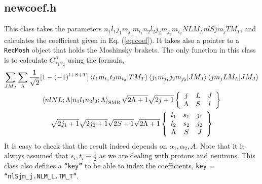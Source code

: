 \documentclass[10pt]{article}
\begin{document}
\subsection{newcoef.h}
This class takes the parameters $n_1 l_1 j_1 m_{j_1} m_{t_1} n_2 l_2 j_2 m_{j_2} m_{t_2} N L M_L n l S j m_j T M_T$, and calculates the coefficient given in Eq. (\ref{eq:coef}). It takes also a pointer to a \texttt{RecMosh} object that holds the Moshinsky brakets. The only function in this class is to calculate $C_{\alpha_1 \alpha_2}^{A}$ using the formula,
\begin{multline}
	\sum_{J M_J} \sum_{\Lambda} 
	\frac{1}{\sqrt{2}} [ 1 - (-1)^{l+S+T}] \braket{ t_1 m_{t_1} t_2 m_{t_2} | T M_T }
	\braket{ j_1 m_{j_1} j_2 m_{j_2} | J M_J}
	\braket{ j m_j L M_L | J M_J } \\
	\braket{ n l N L; \Lambda | n_1 l_1 n_2 l_2 ; \Lambda}_{\textrm{SMB}}
	\sqrt{2 \Lambda + 1} \sqrt{ 2j+1}
	\left\{
	\begin{array}{ccc}
		j & L & J \\
		\Lambda & S & l
	\end{array}
	\right\} \\
	\sqrt{2j_1 + 1} \sqrt{2j_2 + 1} \sqrt{ 2S + 1} \sqrt{ 2 \Lambda + 1}
	\left\{
	\begin{array}{ccc}
		l_1 & s_1 & j_1 \\
		l_2 & s_2 & j_2 \\
		\Lambda & S & J \\
	\end{array}
	\right\}
\end{multline}
It is easy to check that the result indeed depends on $\alpha_1, \alpha_2, A$. Note that it is always assumed that $s_i,t_i \equiv \frac{1}{2}$ as we are dealing with protons and neutrons.
This class also defines a \texttt{``key''} to be able to index the coefficients, \texttt{key = ``nlSjm\_j.NLM\_L.TM\_T''}.
\end{document}
